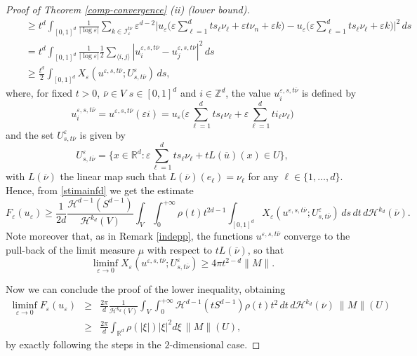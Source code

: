 \documentclass[11pt]{article}
\def\e{\varepsilon}
\begin{document}
\begin{proof}[Proof of Theorem {\rm\ref{comp-convergence}} {\rm (ii)} (lower bound)]
\begin{eqnarray*}
&&\geq t^d \int_{[0,1]^d} \frac{1}{|\log\e|}\sum_{k\in \mathcal I_\e^{t\overline \nu}} \e^{d-2} 
\Big|u_\e\Big(\e \sum_{\ell=1}^d t s_\ell\nu_\ell +\e t\nu_n +\e k\Big)-u_\e\Big(\e \sum_{\ell=1}^d t s_\ell\nu_\ell +\e k\Big)\Big|^2\, ds\\
&&=t^d \int_{[0,1]^d} \frac{1}{|\log\e|} \frac{1}{2}\sum_{\langle i, j \rangle} |u_i^{\e, s, t\overline \nu}-u_j^{\e, s, t\overline \nu}|^2 \, ds\\
&&\geq \frac{t^d}{2} \int_{[0,1]^d} X_\e(u^{\e,s, t\overline \nu}; U^\e_{s,t\overline\nu}) \, ds, 
\end{eqnarray*} 
where, for fixed $t>0$, $\overline \nu\in V$ $s\in[0,1]^d$ and $i\in\mathbb Z^d$, the value $u^{\e,s,t\overline \nu}_i$ is defined 
by
\begin{equation}\label{uexizd}
u^{\e,s,t\overline \nu}_i=u^{\e,s,t\overline \nu}(\e i)=u_\e\bigg(\e\sum_{\ell=1}^d t s_\ell\nu_\ell 
+\e \sum_{\ell=1}^d t i_\ell \nu_\ell\bigg)
\end{equation} 
and the set $U^\e_{s,t\overline \nu}$ is given by 
$$U^\e_{s,t\overline \nu}=\Big\{x\in\mathbb R^d: \e\sum_{\ell=1}^d t s_\ell \nu_\ell+t L(\overline u)(x)\in U\Big\},$$ 
with $L(\overline \nu)$ the linear map such that $L(\overline \nu)(e_\ell)=\nu_\ell$ for any $
\ell\in\{1,\dots, d\}$. 
Hence, from \eqref{stimainfd} we get the estimate 
\begin{equation}\label{stimainfd2}
F_\e(u_\e)\geq \frac{1}{2d}\frac{\mathcal H^{d-1}(S^{d-1})}{\mathcal H^{k_d}(V)} 
\int_{V}\int_0^{+\infty} \rho(t) t^{2d-1} \int_{[0,1]^d} X_\e(u^{\e,s, t\overline \nu}; U^\e_{s,t\overline\nu}) \, ds   \, dt\, d\mathcal H^{k_d}(\overline \nu).  
\end{equation}
Note moreover that, as in Remark \ref{indepp}, the functions $u^{\e,s,t \overline \nu}$ converge to the pull-back of the limit measure $\mu$ with respect to $t L(\overline \nu)$, so that 
$$\liminf_{\e\to 0} X_\e (u^{\e,s,t\overline \nu}; U^\e_{s,t\overline \nu})\geq 4\pi t^{2-d}\|M\|.$$


Now we can conclude the proof of the lower inequality, obtaining 
\begin{eqnarray*}
\liminf_{\e\to 0}F_\e(u_\e)&\geq& 
\frac{2\pi}{d}\frac{1}{\mathcal H^{k_d}(V)} 
\int_{V}
\int_0^{+\infty} \mathcal H^{d-1}(t S^{d-1}) \rho(t) t^{2}    \, dt\, d\mathcal H^{k_d}(\overline \nu)\ \|M\|(U)
\\
&\geq&  \frac{2\pi}{d}\int_{\mathbb R^d}\rho(|\xi|)|\xi|^2d\xi\,  \|M\|(U),
\end{eqnarray*} 
by exactly following the steps in the $2$-dimensional case. 
\end{proof}
\end{document}
